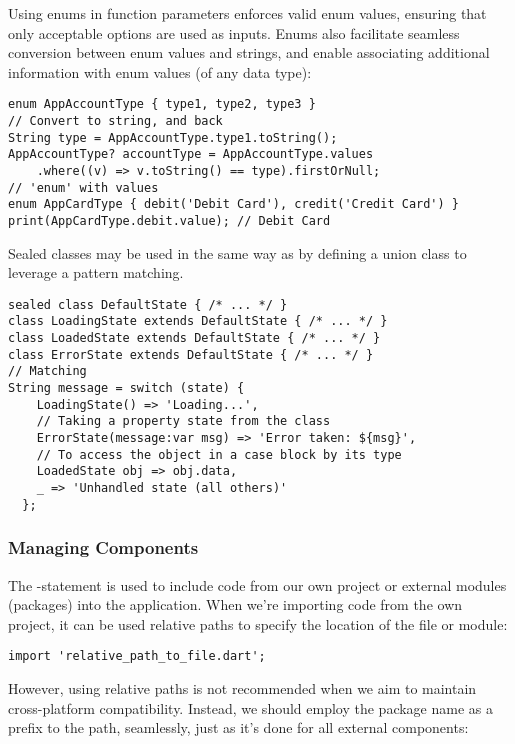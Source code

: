 \noindent Using enums in function parameters enforces valid enum values, ensuring that only acceptable options are used 
as inputs. Enums also facilitate seamless conversion between enum values and strings, and enable associating additional 
information with enum values (of any data type):

\begin{lstlisting}
enum AppAccountType { type1, type2, type3 }
// Convert to string, and back
String type = AppAccountType.type1.toString();
AppAccountType? accountType = AppAccountType.values
    .where((v) => v.toString() == type).firstOrNull;
// 'enum' with values
enum AppCardType { debit('Debit Card'), credit('Credit Card') }
print(AppCardType.debit.value); // Debit Card
\end{lstlisting}

\noindent Sealed classes may be used in the same way as  by defining a union class to leverage a pattern matching.

\begin{lstlisting}
sealed class DefaultState { /* ... */ }
class LoadingState extends DefaultState { /* ... */ }
class LoadedState extends DefaultState { /* ... */ }
class ErrorState extends DefaultState { /* ... */ }
// Matching
String message = switch (state) {
    LoadingState() => 'Loading...',
    // Taking a property state from the class
    ErrorState(message:var msg) => 'Error taken: ${msg}',
    // To access the object in a case block by its type 
    LoadedState obj => obj.data,    
    _ => 'Unhandled state (all others)'
  };
\end{lstlisting}


\newpage
\subsubsection{Managing Components}

The -statement is used to include code from our own project or external modules (packages) into the 
application. When we're importing code from the own project, it can be used relative paths to specify the location of 
the file or module:

\begin{lstlisting}
import 'relative_path_to_file.dart';
\end{lstlisting}

\noindent However, using relative paths is not recommended when we aim to maintain cross-platform compatibility. 
Instead, we should employ the package name as a prefix to the path, seamlessly, just as it's done for all external 
components:

